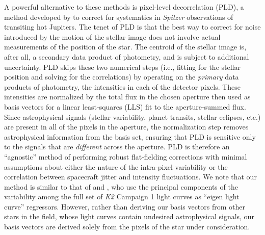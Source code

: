\documentclass[]{emulateapj}
\begin{document}
A powerful alternative to these methods is pixel-level decorrelation (PLD), a method developed
by \cite{DEM15} to correct for systematics in \emph{Spitzer} observations of transiting
hot Jupiters. The tenet of PLD is that the best way to correct for noise introduced by
the motion of the stellar image does not involve actual measurements of the position
of the star. The centroid of the stellar image is, after all, a secondary data product
of photometry, and is subject to additional uncertainty.
PLD skips these two numerical steps (i.e., fitting for the stellar position and solving
for the correlations) by operating on the \emph{primary} data products of photometry, the
intensities in each of the detector pixels. 
These intensities are normalized by the
total flux in the chosen aperture then used as basis vectors for a linear least-squares 
(LLS) fit to the aperture-summed flux. Since astrophysical signals (stellar variability,
planet transits, stellar eclipses, etc.) are present in all of the pixels in the aperture,
the normalization step removes astrophysical information from the basis set, ensuring
that PLD is sensitive only to the signals that are \emph{different} across the aperture. PLD is
therefore an ``agnostic'' method of performing robust flat-fielding corrections with
minimal assumptions about either the nature of the intra-pixel variability or the correlation 
between spacecraft jitter and intensity fluctuations. We note that our method is similar 
to that of \cite{DFM15} and \cite{MON15}, who use the principal components of the variability 
among the full set of \emph{K2} Campaign 1 light curves as ``eigen light curve'' regressors.
However, rather than deriving our basis vectors from other stars in the field, whose
light curves contain undesired astrophysical signals, our basis vectors are derived
solely from the pixels of the star under consideration.
\end{document}
